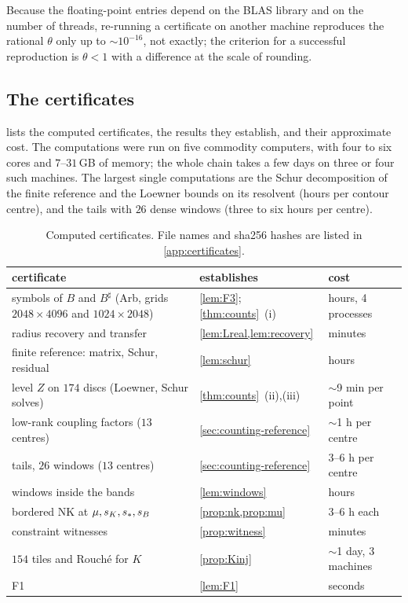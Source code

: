 Because the floating-point entries depend on the BLAS library and on the number of threads, re-running a
certificate on another machine reproduces the rational $\theta$ only up to $\sim10^{-16}$, not exactly; the
criterion for a successful reproduction is $\theta<1$ with a difference at the scale of rounding.

\subsection{The certificates}\label{sec:computation-certs}

 lists the computed certificates, the results they establish, and their approximate cost. The
computations were run on five commodity computers, with four to six cores and $7$--$31$\,GB of memory; the whole
chain takes a few days on three or four such machines. The largest single computations are the Schur
decomposition of the finite reference and the Loewner bounds on its resolvent (hours per contour centre), and the
tails with $26$ dense windows (three to six hours per centre).

\begin{table}[ht]
\centering
\small
\begin{tabular}{@{}p{}p{}p{}@{}}
\toprule
certificate & establishes & cost \\
\midrule
symbols of $B$ and $B^\sharp$ (Arb, grids $2048\times4096$ and $1024\times2048$) & \cref{lem:F3}; \cref{thm:counts}~(i) & hours, 4 processes \\
radius recovery and transfer & \cref{lem:Lreal,lem:recovery} & minutes \\
finite reference: matrix, Schur, residual & \cref{lem:schur} & hours \\
level $Z$ on $174$ discs (Loewner, Schur solves) & \cref{thm:counts}~(ii),(iii) & $\sim$9 min per point \\
low-rank coupling factors ($13$ centres) & \cref{sec:counting-reference} & $\sim$1 h per centre \\
tails, $26$ windows ($13$ centres) & \cref{sec:counting-reference} & 3--6 h per centre \\
windows inside the bands & \cref{lem:windows} & hours \\
bordered NK at $\mu,s_{K},s_{\ast},s_{B}$ & \cref{prop:nk,prop:mu} & 3--6 h each \\
constraint witnesses & \cref{prop:witness} & minutes \\
$154$ tiles and Rouch\'e for $K$ & \cref{prop:Kinj} & $\sim$1 day, 3 machines \\
F1 & \cref{lem:F1} & seconds \\
\bottomrule
\end{tabular}
\caption{Computed certificates. File names and sha256 hashes are listed in \cref{app:certificates}.}
\label{tab:certs}
\end{table}

